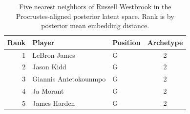 \begin{table}[htbp]
  \centering\small
  \begin{tabular}{rllc}
    \toprule
    Rank & Player & Position & Archetype \\
    \midrule
    1 & LeBron James & G & 2 \\
    2 & Jason Kidd & G & 2 \\
    3 & Giannis Antetokounmpo & G & 2 \\
    4 & Ja Morant & G & 2 \\
    5 & James Harden & G & 2 \\
    \bottomrule
  \end{tabular}
  \caption{Five nearest neighbors of Russell Westbrook in the Procrustes-aligned posterior latent space. Rank is by posterior mean embedding distance.}
  \label{tab:Russell_Westbrook_neighbors}
\end{table}

